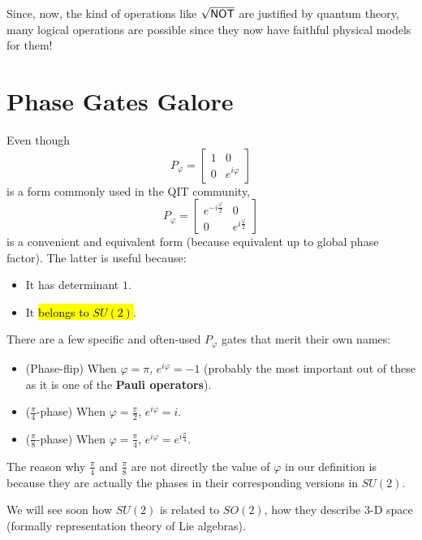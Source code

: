 \documentclass[12pt]{article}
\begin{document}
\begin{remark}
Since, now, the kind of operations like $\sqrt{{\textsf{NOT}}}$ are justified by quantum theory, many logical operations are possible since they now have faithful physical models for them!
\end{remark}

\section{Phase Gates Galore}
\begin{remark}
Even though $$
P_\varphi = \begin{bmatrix}
1 & 0\\
0 & e^{i\varphi}
\end{bmatrix}
$$ is a form commonly used in the QIT community, $$
P_\varphi = \begin{bmatrix}
e^{-i\frac{\varphi}{2}} & 0\\
0 & e^{i\frac{\varphi}{2}}
\end{bmatrix}
$$ is a convenient and equivalent form (because equivalent up to global phase factor). The latter is useful because:
\begin{itemize}
    \item It has determinant $1$.
    \item It \hl{belongs to $SU(2)$}.
\end{itemize}
\end{remark}

\begin{definition}
There are a few specific and often-used $P_\varphi$ gates that merit their own names:
\begin{itemize}
    \item (Phase-flip) When $\varphi = \pi$, $e^{i\varphi} = -1$ (probably the most important out of these as it is one of the \textbf{Pauli operators}).
    \item ($\frac{\pi}{4}$-phase) When $\varphi =\frac{\pi}{2}$, $e^{i\varphi} = i$.
    \item ($\frac{\pi}{8}$-phase) When $\varphi =\frac{\pi}{4}$, $e^{i\varphi} = e^{i\frac{\pi}{4}}$.
\end{itemize}
The reason why $\frac{\pi}{4}$ and $\frac{\pi}{8}$ are not directly the value of $\varphi$ in our definition is because they are actually the phases in their corresponding versions in $SU(2)$.
\end{definition}

\begin{remark}
We will see soon how $SU(2)$ is related to $SO(2)$, how they describe $3$-D space (formally representation theory of Lie algebras).
\end{remark}
\end{document}

